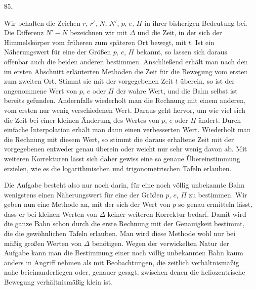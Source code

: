 \par{}\medskip
\hypertarget{native-114-article085}{}
\begin{center}85.\end{center}
Wir behalten die Zeichen $r$, $r'$, $N$, $N'$, $p$, $e$, $\Pi$ in ihrer bisherigen Bedeutung bei. Die Differenz $N'-N$ bezeichnen wir mit $\Delta$ und die Zeit, in der sich der Himmelskörper vom früheren zum späteren Ort bewegt, mit $t$. Ist ein Näherungswert für eine der Größen $p$, $e$, $\Pi$ bekannt, so lassen sich daraus offenbar auch die beiden anderen bestimmen. Anschließend erhält man nach den im ersten Abschnitt erläuterten Methoden die Zeit für die Bewegung vom ersten zum zweiten Ort. Stimmt sie mit der vorgegebenen Zeit $t$ überein, so ist der angenommene Wert von $p$, $e$ oder $\Pi$ der wahre Wert, und die Bahn selbst ist bereits gefunden. Andernfalls wiederholt man die Rechnung mit einem anderen, vom ersten nur wenig verschiedenen Wert. Daraus geht hervor, um wie viel sich die Zeit bei einer kleinen Änderung des Wertes von $p$, $e$ oder $\Pi$ ändert. Durch einfache Interpolation erhält man dann einen verbesserten Wert. Wiederholt man die Rechnung mit diesem Wert, so stimmt die daraus erhaltene Zeit mit der vorgegebenen entweder genau überein oder weicht nur sehr wenig davon ab. Mit weiteren Korrekturen lässt sich daher gewiss eine so genaue Übereinstimmung erzielen, wie es die logarithmischen und trigonometrischen Tafeln erlauben.

Die Aufgabe besteht also nur noch darin, für eine noch völlig unbekannte Bahn wenigstens einen Näherungswert für eine der Größen $p$, $e$, $\Pi$ zu bestimmen. Wir geben nun eine Methode an, mit der sich der Wert von $p$ so genau ermitteln lässt, dass er bei kleinen Werten von $\Delta$ keiner weiteren Korrektur bedarf. Damit wird die ganze Bahn schon durch die erste Rechnung mit der Genauigkeit bestimmt, die die gewöhnlichen Tafeln erlauben. Man wird diese Methode wohl nur bei mäßig großen Werten von $\Delta$ benötigen. Wegen der verwickelten Natur der Aufgabe kann man die Bestimmung einer noch völlig unbekannten Bahn kaum anders in Angriff nehmen als mit Beobachtungen, die zeitlich verhältnismäßig nahe beieinanderliegen oder, genauer gesagt, zwischen denen die heliozentrische Bewegung verhältnismäßig klein ist.
